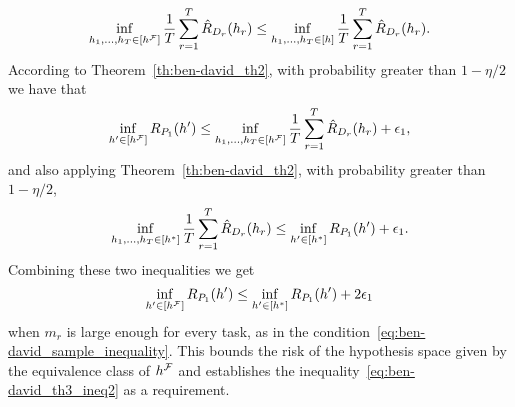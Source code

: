 \begin{equation}
    \nonumber
    \inf_{h_1, \ldots, h_T \in \lbrack h^{\mathcal{F}}\rbrack} \frac{1}{T} \sum_{r=1}^T \hat{R}_{D_r}(h_r) \leq \inf_{h_1, \ldots, h_T \in \lbrack h\rbrack} \frac{1}{T} \sum_{r=1}^T \hat{R}_{D_r}(h_r) .
\end{equation}
According to Theorem~\ref{th:ben-david_th2}, with probability greater than $1 - \eta/2$ we have that
\begin{equation}
    \nonumber
    {\inf_{h' \in \lbrack h^{\mathcal{F}}\rbrack}R_{P_1}(h')} \leq \inf_{h_1, \ldots, h_T \in \lbrack h^{\mathcal{F}}\rbrack} \frac{1}{T} \sum_{r=1}^T \hat{R}_{D_r}(h_r)  + \epsilon_1,
\end{equation}
and also applying Theorem~\ref{th:ben-david_th2}, with probability greater than $1 - \eta/2$,
\begin{equation}
    \nonumber
    {\inf_{h_1, \ldots, h_T\in \lbrack h^*\rbrack} \frac{1}{T} \sum_{r=1}^T\hat{R}_{D_r}(h_r) \leq \inf_{h' \in \lbrack h^*\rbrack}R_{P_1}(h')}  + \epsilon_1.
\end{equation}
Combining these two inequalities we get
\begin{equation}
    \nonumber
    \inf_{h' \in \lbrack h^{\mathcal{F}}\rbrack}R_{P_1}(h') \leq \inf_{h' \in \lbrack h^*\rbrack}R_{P_1}(h') + 2\epsilon_1 
\end{equation}
when $m_r$ is large enough for every task, as in the condition~\eqref{eq:ben-david_sample_inequality}. This bounds the risk of the hypothesis space given by the equivalence class of $h^{\mathcal{F}}$ and establishes the inequality~\eqref{eq:ben-david_th3_ineq2} as a requirement.
%

